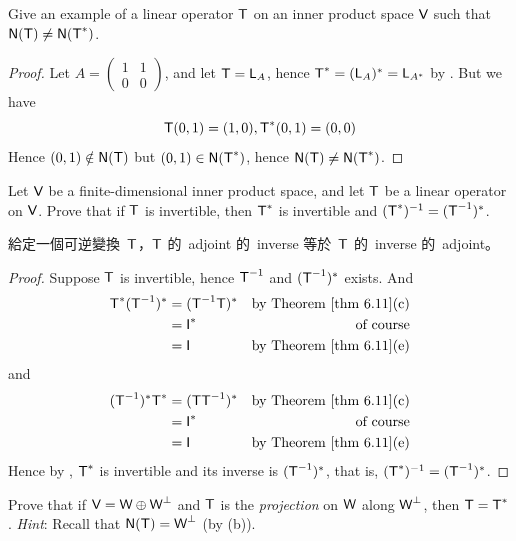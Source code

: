\begin{exercise} \label{exercise 6.3.7}
Give an example of a linear operator \(\textsf{T}\) on an inner product space \(\textsf{V}\) such that \(\textsf{N}(\textsf{T}) \ne \textsf{N}(\textsf{T}^*)\).
\end{exercise}

\begin{proof}
Let \(A = \begin{pmatrix} 1 & 1 \\ 0 & 0 \end{pmatrix}\), and let \(\textsf{T} = \textsf{L}_A\), hence \(\textsf{T}^* = (\textsf{L}_A)^* = \textsf{L}_{A^*}\) by .
But we have
\[
    \textsf{T}(0, 1) = (1, 0), \textsf{T}^*(0, 1) = (0, 0)
\]
Hence \((0, 1) \notin \textsf{N}(\textsf{T})\) but \((0, 1) \in \textsf{N}(\textsf{T}^*)\), hence \(\textsf{N}(\textsf{T}) \ne \textsf{N}(\textsf{T}^*)\).
\end{proof}

\begin{exercise} \label{exercise 6.3.8}
Let \(\textsf{V}\) be a finite-dimensional inner product space, and let \(\textsf{T}\) be a linear operator on \(\textsf{V}\).
Prove that if \(\textsf{T}\) is invertible, then \(\textsf{T}^*\) is invertible and \((\textsf{T}^*)^{-1} = (\textsf{T}^{-1})^*\).
\end{exercise}

\begin{note}
給定一個可逆變換\ \(\textsf{T}\)，\(\textsf{T}\) 的\ adjoint 的\ inverse 等於\ \(\textsf{T}\) 的\ inverse 的\ adjoint。
\end{note}

\begin{proof}
Suppose \(\textsf{T}\) is invertible, hence \(\textsf{T}^{-1}\) and \((\textsf{T}^{-1})^*\) exists.
And
\begin{align*}
    \T^* (\T^{-1})^* & = (\T^{-1} \T)^* & \text{by \THM{6.11}(c)} \\
        & = \ITRAN{}^* & \text{of course} \\
        & = \ITRAN{} & \text{by \THM{6.11}(e)}
\end{align*}
and
\begin{align*}
    (\T^{-1})^* \T^* & = (\T \T^{-1})^* & \text{by \THM{6.11}(c)} \\
        & = \ITRAN{}^* & \text{of course} \\
        & = \ITRAN{} & \text{by \THM{6.11}(e)}
\end{align*}
Hence by , \(\textsf{T}^*\) is invertible and its inverse is \((\textsf{T}^{-1})^*\), that is, \((\textsf{T}^*)^{-1} = (\textsf{T}^{-1})^*\).
\end{proof}

\begin{exercise} \label{exercise 6.3.9}
Prove that if \(\textsf{V} = \textsf{W} \oplus \textsf{W}^{\perp}\) and \(\textsf{T}\) is the \emph{projection} on \(\textsf{W}\) along \(\textsf{W}^{\perp}\), then \(\textsf{T} = \textsf{T}^*\).
\emph{Hint}: Recall that \(\textsf{N}(\textsf{T}) = \textsf{W}^{\perp}\) (by (b)).
\end{exercise}

